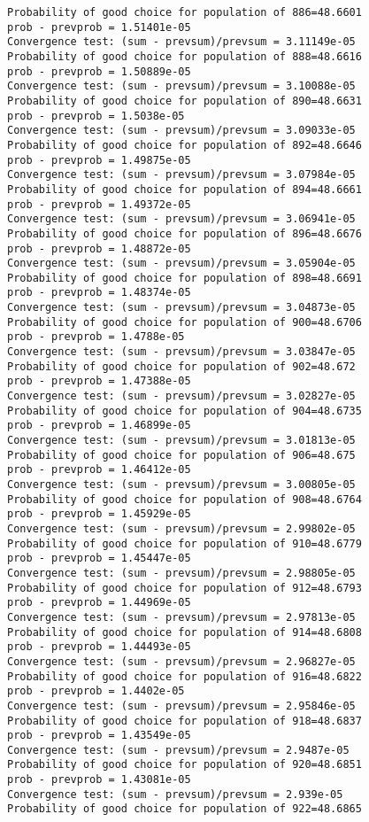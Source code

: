 \documentclass[11pt,onecolumn]{article}
\begin{document}
\begin{verbatim}
Probability of good choice for population of 886=48.6601
prob - prevprob = 1.51401e-05
Convergence test: (sum - prevsum)/prevsum = 3.11149e-05
Probability of good choice for population of 888=48.6616
prob - prevprob = 1.50889e-05
Convergence test: (sum - prevsum)/prevsum = 3.10088e-05
Probability of good choice for population of 890=48.6631
prob - prevprob = 1.5038e-05
Convergence test: (sum - prevsum)/prevsum = 3.09033e-05
Probability of good choice for population of 892=48.6646
prob - prevprob = 1.49875e-05
Convergence test: (sum - prevsum)/prevsum = 3.07984e-05
Probability of good choice for population of 894=48.6661
prob - prevprob = 1.49372e-05
Convergence test: (sum - prevsum)/prevsum = 3.06941e-05
Probability of good choice for population of 896=48.6676
prob - prevprob = 1.48872e-05
Convergence test: (sum - prevsum)/prevsum = 3.05904e-05
Probability of good choice for population of 898=48.6691
prob - prevprob = 1.48374e-05
Convergence test: (sum - prevsum)/prevsum = 3.04873e-05
Probability of good choice for population of 900=48.6706
prob - prevprob = 1.4788e-05
Convergence test: (sum - prevsum)/prevsum = 3.03847e-05
Probability of good choice for population of 902=48.672
prob - prevprob = 1.47388e-05
Convergence test: (sum - prevsum)/prevsum = 3.02827e-05
Probability of good choice for population of 904=48.6735
prob - prevprob = 1.46899e-05
Convergence test: (sum - prevsum)/prevsum = 3.01813e-05
Probability of good choice for population of 906=48.675
prob - prevprob = 1.46412e-05
Convergence test: (sum - prevsum)/prevsum = 3.00805e-05
Probability of good choice for population of 908=48.6764
prob - prevprob = 1.45929e-05
Convergence test: (sum - prevsum)/prevsum = 2.99802e-05
Probability of good choice for population of 910=48.6779
prob - prevprob = 1.45447e-05
Convergence test: (sum - prevsum)/prevsum = 2.98805e-05
Probability of good choice for population of 912=48.6793
prob - prevprob = 1.44969e-05
Convergence test: (sum - prevsum)/prevsum = 2.97813e-05
Probability of good choice for population of 914=48.6808
prob - prevprob = 1.44493e-05
Convergence test: (sum - prevsum)/prevsum = 2.96827e-05
Probability of good choice for population of 916=48.6822
prob - prevprob = 1.4402e-05
Convergence test: (sum - prevsum)/prevsum = 2.95846e-05
Probability of good choice for population of 918=48.6837
prob - prevprob = 1.43549e-05
Convergence test: (sum - prevsum)/prevsum = 2.9487e-05
Probability of good choice for population of 920=48.6851
prob - prevprob = 1.43081e-05
Convergence test: (sum - prevsum)/prevsum = 2.939e-05
Probability of good choice for population of 922=48.6865

\end{verbatim}
\end{document}
